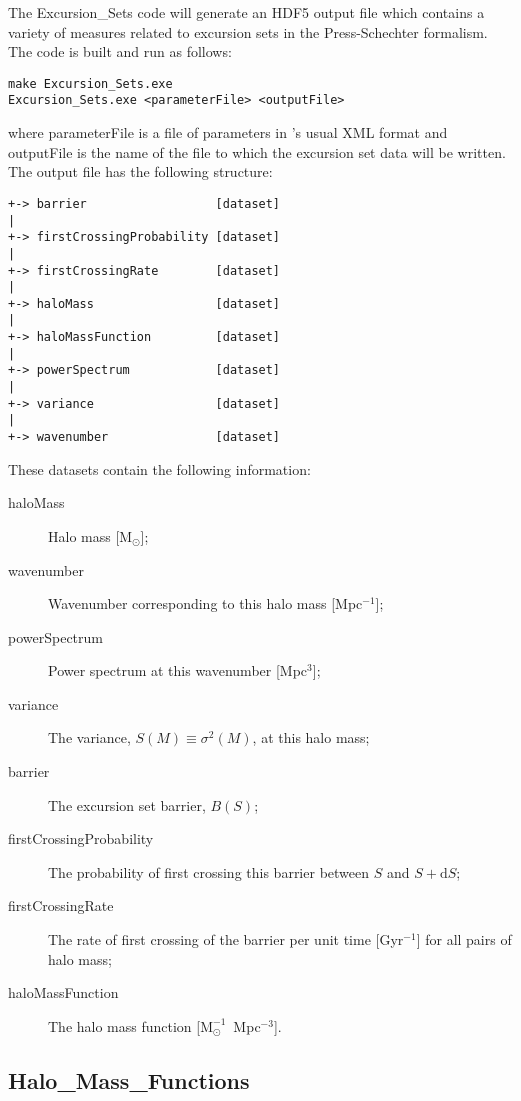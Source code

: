 The {\normalfont \ttfamily Excursion\_Sets} code will generate an HDF5 output file which contains a variety of measures related to excursion sets in the Press-Schechter formalism. The code is built and run as follows:
\begin{verbatim}
make Excursion_Sets.exe
Excursion_Sets.exe <parameterFile> <outputFile>
\end{verbatim}
where {\normalfont \ttfamily parameterFile} is a file of parameters in \glc's usual XML format and {\normalfont \ttfamily outputFile} is the name of the file to which the excursion set data will be written. The output file has the following structure:
\begin{verbatim}
+-> barrier                  [dataset]
|
+-> firstCrossingProbability [dataset]
|
+-> firstCrossingRate        [dataset]
|
+-> haloMass                 [dataset]
|
+-> haloMassFunction         [dataset]
|
+-> powerSpectrum            [dataset]
|
+-> variance                 [dataset]
|
+-> wavenumber               [dataset]
\end{verbatim}
These datasets contain the following information:
\begin{description}
 \item [{\normalfont \ttfamily haloMass}] Halo mass [${\mathrm M}_\odot$];
 \item [{\normalfont \ttfamily wavenumber}] Wavenumber corresponding to this halo mass [Mpc$^{-1}$];
 \item [{\normalfont \ttfamily powerSpectrum}] Power spectrum at this wavenumber [Mpc$^3$];
 \item [{\normalfont \ttfamily variance}] The variance, $S(M)\equiv\sigma^2(M)$, at this halo mass;
 \item [{\normalfont \ttfamily barrier}] The excursion set barrier, $B(S)$;
 \item [{\normalfont \ttfamily firstCrossingProbability}] The probability of first crossing this barrier between $S$ and $S+{\mathrm d}S$;
 \item [{\normalfont \ttfamily firstCrossingRate}] The rate of first crossing of the barrier per unit time [Gyr$^{-1}$] for all pairs of halo mass;
 \item [{\normalfont \ttfamily haloMassFunction}] The halo mass function [${\mathrm M}^{-1}_\odot$~Mpc$^{-3}$].
\end{description}

\subsection{{\normalfont \ttfamily Halo\_Mass\_Functions}}


